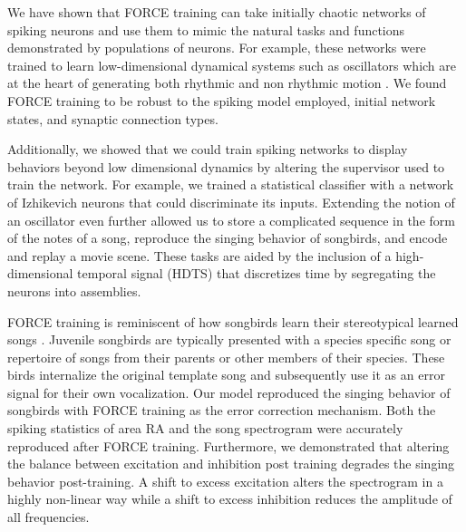 \documentclass[11pt]{article} %
\begin{document}
  We have shown that FORCE training can take initially chaotic networks of spiking neurons and use them to mimic the natural tasks and functions demonstrated by populations of neurons.  For example, these networks were trained to learn low-dimensional dynamical systems such as oscillators which are at the heart of generating both rhythmic and non rhythmic motion \cite{CHURCHLAND1}.   We found FORCE training to be robust to the spiking model employed, initial network states, and synaptic connection types.   

 Additionally, we showed that we could train spiking networks to display behaviors beyond low dimensional dynamics by altering the supervisor used to train the network.  For example, we trained a statistical classifier with a network of Izhikevich neurons that could discriminate its inputs.  Extending the notion of an oscillator even further allowed us to store a complicated sequence in the form of the notes of a song, reproduce the singing behavior of songbirds, and encode and replay a movie scene. These tasks are aided by the inclusion of a high-dimensional temporal signal (HDTS) that discretizes time by segregating the neurons into assemblies.  
 


FORCE training is reminiscent of how songbirds learn their stereotypical learned songs \cite{konishi,Hanloser}.  Juvenile songbirds are typically presented with a species specific song or repertoire of songs from their parents or other members of their species.  These birds internalize the original template song and subsequently use it as an error signal for their own vocalization\cite{konishi,Mooney,Bouchard,Fee1,Fee2,Fee3,Hanloser,nottebohm}.  Our model reproduced the singing behavior of songbirds with FORCE training as the error correction mechanism.  Both the spiking statistics of area RA and the song spectrogram were accurately reproduced after FORCE training.  Furthermore, we demonstrated that altering the balance between excitation and inhibition post training degrades the singing behavior post-training.  A shift to excess excitation alters the spectrogram in a highly non-linear way while a shift to excess inhibition reduces the amplitude of all frequencies.
\end{document}
